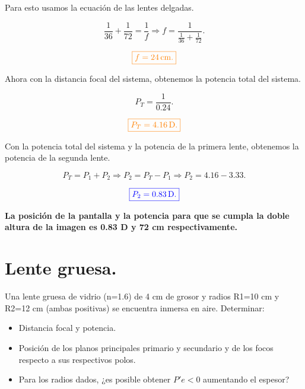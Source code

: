 \documentclass[a4paper,12pt]{article} %
\begin{document}
\begin{justify}
	Para esto usamos la ecuación de las lentes delgadas.
\end{justify}

\[ \frac{1}{36} + \frac{1}{72} = \frac{1}{f} \Rightarrow f = \frac{1}{\frac{1}{36} + \frac{1}{72}}. \]

\vspace{\baselineskip}

\[\textcolor{orange}{\boxed{f = 24 \, \mathrm{cm}.}}\]

\begin{justify}
	Ahora con la distancia focal del sistema, obtenemos la potencia total del sistema.
\end{justify}

\[ P_T = \frac{1}{0.24}. \]
\vspace{\baselineskip}

\[\textcolor{orange}{\boxed{P_T = 4.16 \, \mathrm{D}. }}\]

\begin{justify}
	Con la potencia total del sistema y la potencia de la primera lente, obtenemos la potencia de la segunda lente.
\end{justify}

\[ P_T = P_1 + P_2 \Rightarrow P_2 = P_T - P_1 \Rightarrow P_2 = 4.16 - 3.33. \]

\[ \textcolor{blue}{\boxed{P_2 = 0.83 \, \mathrm{D}. }} \]

\begin{justify}
	\textbf{La posición de la pantalla y la potencia para que se cumpla la doble altura de la imagen es 0.83 D y 72 cm respectivamente.}
\end{justify}

\vspace{\baselineskip}

\section{Lente gruesa.}

\begin{justify}
	Una lente gruesa de vidrio (n=1.6) de 4 cm de grosor y radios R1=10 cm y R2=12 cm (ambas positivas) se encuentra inmersa en aire. Determinar:
\end{justify}

\begin{itemize}
	\item Distancia focal y potencia. 
	\item Posición de los planos principales primario y secundario y de los focos respecto a sus respectivos polos. 
	\item Para los radios dados, ¿es posible obtener \(P'e<0\) aumentando el espesor? 
\end{itemize}
\end{document}
